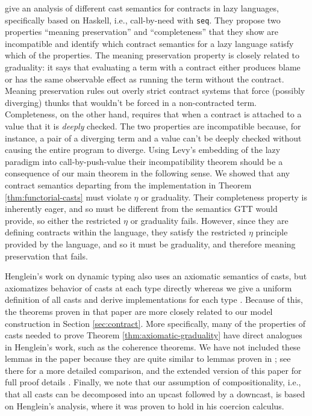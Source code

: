\documentclass[acmsmall,screen,12pt]{acmart}
\newif\iflong
\newcommand{\seq}{\texttt{seq}}
\begin{document}
{\citet{Degen2012TheIO} give an analysis of different cast semantics
for contracts in lazy languages, specifically based on Haskell, i.e., 
call-by-need with \seq.
%
They propose two properties ``meaning preservation'' and
``completeness'' that they show are incompatible and identify which
contract semantics for a lazy language satisfy which of the
properties.
%
The meaning preservation property is closely related to graduality: it
says that evaluating a term with a contract either produces blame or
has the same observable effect as running the term without the
contract.
%
Meaning preservation rules out overly strict contract systems that
force (possibly diverging) thunks that wouldn't be forced in a
non-contracted term.
%
Completeness, on the other hand, requires that when a contract is
attached to a value that it is \emph{deeply} checked.
%
The two properties are incompatible because, for instance, a pair of a
diverging term and a value can't be deeply checked without causing the
entire program to diverge.
%
Using Levy's embedding of the lazy paradigm into call-by-push-value
their incompatibility theorem should be a consequence of our main
theorem in the following sense.
%
We showed that any contract semantics departing from the
implementation in Theorem \ref{thm:functorial-casts} must violate
$\eta$ or graduality.
%
Their completeness property is inherently eager, and so must be
different from the semantics GTT would provide, so either the
restricted $\eta$ or graduality fails.
%
However, since they are defining contracts within the language, they
satisfy the restricted $\eta$ principle provided by the language, and
so it must be graduality, and therefore meaning preservation that
fails.

\iflong\paragraph{Axiomatic Casts}\fi

Henglein's work on dynamic typing also uses an axiomatic semantics of
casts, but axiomatizes behavior of casts at each type directly whereas
we give a uniform definition of all casts and derive implementations
for each type \cite{henglein94:dynamic-typing}.
%
Because of this, the theorems proven in that paper are more closely
related to our model construction in Section
\ref{sec:contract}.
%
More specifically, many of the properties of casts needed to prove
Theorem \ref{thm:axiomatic-graduality} have direct analogues
in Henglein's work, such as the coherence theorems.
%
We have not included these lemmas in the paper because they are quite
similar to lemmas proven in \citet{newahmed18}; see there for a more
detailed comparison, and the extended version of this paper for full proof details \citep{newlicataahmed19:extended}.
%
Finally, we note that our assumption of compositionality, i.e., that
all casts can be decomposed into an upcast followed by a downcast, is
based on Henglein's analysis, where it was proven to hold in his
coercion calculus.

}
\end{document}
